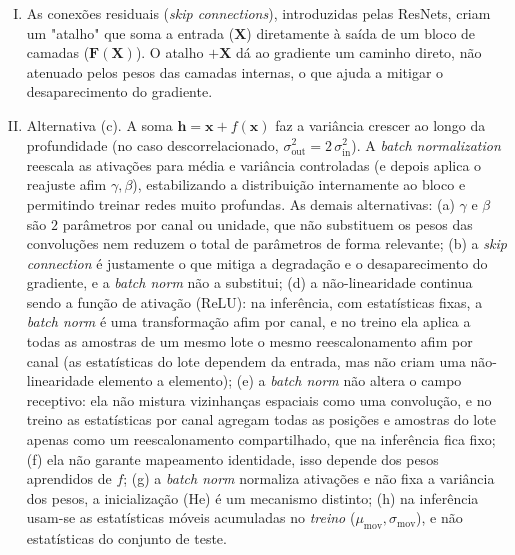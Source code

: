 \documentclass{dlproblemset}
\begin{document}
\begin{enumerate}[I)]
    O bloco se tornaria, efetivamente, uma transformação identidade, simplesmente passando a entrada $\mathbf{X}$ adiante sem qualquer alteração.

    \item As conexões residuais (\textit{skip connections}), introduzidas pelas ResNets, criam um "atalho" que soma a entrada ($\mathbf{X}$) diretamente à saída de um bloco de camadas ($\mathbf{F}(\mathbf{X})$). O atalho $+\mathbf{X}$ dá ao gradiente um caminho direto, não atenuado pelos pesos das camadas internas, o que ajuda a mitigar o desaparecimento do gradiente.

    \item Alternativa (c). A soma $\mathbf{h} = \mathbf{x} + f(\mathbf{x})$ faz a variância crescer ao longo da profundidade (no caso descorrelacionado, $\sigma_{\text{out}}^2 = 2\,\sigma_{\text{in}}^2$). A \textit{batch normalization} reescala as ativações para média e variância controladas (e depois aplica o reajuste afim $\gamma, \beta$), estabilizando a distribuição internamente ao bloco e permitindo treinar redes muito profundas. As demais alternativas: (a) $\gamma$ e $\beta$ são $2$ parâmetros por canal ou unidade, que não substituem os pesos das convoluções nem reduzem o total de parâmetros de forma relevante; (b) a \textit{skip connection} é justamente o que mitiga a degradação e o desaparecimento do gradiente, e a \textit{batch norm} não a substitui; (d) a não-linearidade continua sendo a função de ativação (ReLU): na inferência, com estatísticas fixas, a \textit{batch norm} é uma transformação afim por canal, e no treino ela aplica a todas as amostras de um mesmo lote o mesmo reescalonamento afim por canal (as estatísticas do lote dependem da entrada, mas não criam uma não-linearidade elemento a elemento); (e) a \textit{batch norm} não altera o campo receptivo: ela não mistura vizinhanças espaciais como uma convolução, e no treino as estatísticas por canal agregam todas as posições e amostras do lote apenas como um reescalonamento compartilhado, que na inferência fica fixo; (f) ela não garante mapeamento identidade, isso depende dos pesos aprendidos de $f$; (g) a \textit{batch norm} normaliza ativações e não fixa a variância dos pesos, a inicialização (He) é um mecanismo distinto; (h) na inferência usam-se as estatísticas móveis acumuladas no \emph{treino} ($\mu_{\text{mov}}, \sigma_{\text{mov}}$), e não estatísticas do conjunto de teste.


\end{enumerate}
\end{document}
